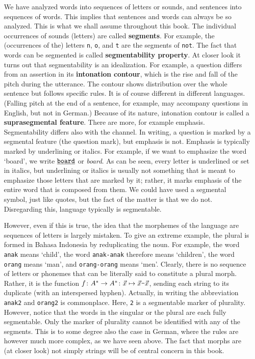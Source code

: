 We have analyzed words into sequences of letters or sounds, and
sentences into sequences of words. This implies that sentences and
words can always be so analyzed. This is what we shall assume
throughout this book. The individual occurrences of
sounds (letters) are called \textbf{segments}. For example, the 
(occurrences of the) letters {\tt n}, {\tt o}, and {\tt t} are the 
segments of {\tt not}. The fact that words can be segmented is called
\textbf{segmentability property}. At closer look it turns out that
segmentability is an idealization. For example, a question differs
from an assertion in its \textbf{intonation contour}, which is 
the rise and fall of the pitch during the utterance. The contour 
shows distribution over the whole sentence but follows
specific rules. It is of course different in different languages.
(Falling pitch at the end of a sentence, for example, may
accompany questions in English, but not in German.) Because of its
nature, intonation contour is called a
\textbf{suprasegmental feature}. There are more, for example emphasis.
Segmentability differs also with the channel.  In writing, a question
is marked by a segmental feature (the question mark), but emphasis is
not. Emphasis is typically marked by underlining or italics. For
example, if we want to emphasize the word `board', we write
$\underline{\mbox{\tt board}}$ or {\it board}. As can be seen, every
letter is underlined or set in italics, but underlining or italics is 
usually not something that is meant to emphasize those letters
that are marked by it; rather, it marks emphasis of the entire
word that is composed from them. We could have used a segmental
symbol, just like quotes, but the fact of the matter is that we
do not. Disregarding this, language typically is segmentable.

However, even if this is true, the idea that the morphemes of the 
language are sequences of letters is largely mistaken. To give an 
extreme example, the plural is formed in Bahasa Indonesia
by reduplicating the noun. For example, the word {\tt anak} means
`child', the word {\tt anak-anak} therefore means `children', the
word {\tt orang} means `man', and {\tt orang-orang} means `men'.
Clearly, there is no sequence of letters or phonemes that can be
literally said to constitute a plural morph. Rather, it is the
function $f \colon A^{\ast} \rightarrow A^{\ast} \colon \vec{x} \mapsto
\vec{x}\mbox{\tt -}\vec{x}$, sending each string to its duplicate
(with an interspersed hyphen). Actually, in writing the
abbreviation {\tt anak2} and {\tt orang2} is commonplace. Here,
{\tt 2} is a segmentable marker of plurality. However, notice that
the words in the singular or the plural are each fully
segmentable. Only the marker of plurality cannot be identified
with any of the segments. This is to some degree also the case in
German, where the rules are however much more complex, as we have
seen above. The fact that morphs are (at closer look) not simply
strings will be of central concern in this book.

